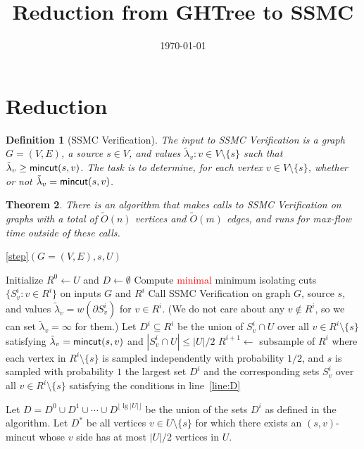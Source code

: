 \documentclass{article}
\newcommand{\cds}{\cdots}
\newcommand{\sm}{\setminus}
\newcommand{\s}{\subseteq}
\newcommand{\la}{\lambda}
\newcommand{\pt}{\partial}
\newcommand{\lf}{\lfloor}
\newcommand{\rf}{\rfloor}
\newcommand{\1}{\mathbbm 1}
\newtheorem{theorem}{Theorem}[section]
\newtheorem{definition}[theorem]{Definition}
\newcommand{\BT}{\begin{theorem}}
\newcommand{\ET}{\end{theorem}}
\newcommand{\BD}{\begin{definition}}
\newcommand{\ED}{\end{definition}}
\newcommand{\alert}{\textcolor{red}}
\newcommand{\tO}{\tilde{O}}
\newcommand{\thml}[1]{\label{thm:#1}}
\newcommand{\linel}[1]{\label{line:#1}}
\renewcommand{\line}[1]{line~\ref{line:#1}}
\newcommand{\mincut}{\textsf{\textup{mincut}}}
\begin{document}
\title{Reduction from GHTree to SSMC}
\date{\today}
\maketitle

\section{Reduction}

\BD[SSMC Verification]
The input to SSMC Verification is a graph $G=(V,E)$, a source $s\in V$, and values $\tilde\la_v:v\in V\sm\{s\}$ such that $\tilde\la_v\ge\mincut(s,v)$. The task is to determine, for each vertex $v\in V\sm\{s\}$, whether or not $\tilde\la_v=\mincut(s,v)$.
\ED

\BT\thml{reduction}
There is an algorithm that makes calls to SSMC Verification on graphs with a total of $\tO(n)$ vertices and $\tO(m)$ edges, and runs for max-flow time outside of these calls.
\ET


\begin{algorithm}
\caption{\ref{step}$(G=(V,E),s,U)$} 
\begin{algorithmic}[1]
\State Initialize $R^0\gets U$ and $D\gets\emptyset$
\For{$i$ from $0$ to $\lf\lg|U|\rf$}
 \State Compute \alert{minimal} minimum isolating cuts $\{S^i_v:v\in R^i\}$ on inputs $G$ and $R^i$ \linel{Sv}
 \State Call SSMC Verification on graph $G$, source $s$, and values $\tilde\la_v=w(\pt S^i_v)$ for $v\in R^i$. (We do not care about any $v\notin R^i$, so we can set $\tilde\la_v=\infty$ for them.)
 \State Let $D^i\s R^i$ be the union of $S^i_v\cap U$ over all $v\in R^i\sm\{s\}$ satisfying $\tilde\la_v=\mincut(s,v)$ and $|S^i_v\cap U|\le|U|/2$\linel{D}
 \State $R^{i+1}\gets$ subsample of $R^i$ where each vertex in $R^i\sm \{s\}$ is sampled independently with probability $1/2$, and $s$ is sampled with probability $1$
\EndFor
\State\Return the largest set $D^i$ and the corresponding sets $S^i_v$ over all $v\in R^i\sm\{s\}$ satisfying the conditions in \line{D} %
\end{algorithmic}
\end{algorithm}

Let $D=D^0\cup D^1\cup \cds\cup D^{\lf\lg|U|\rf}$ be the union of the sets $D^i$ as defined in the algorithm. Let $D^*$ be all vertices $v\in U\sm \{s\}$ for which there exists an $(s,v)$-mincut whose $v$ side has at most $|U|/2$ vertices in $U$. 
\end{document}
